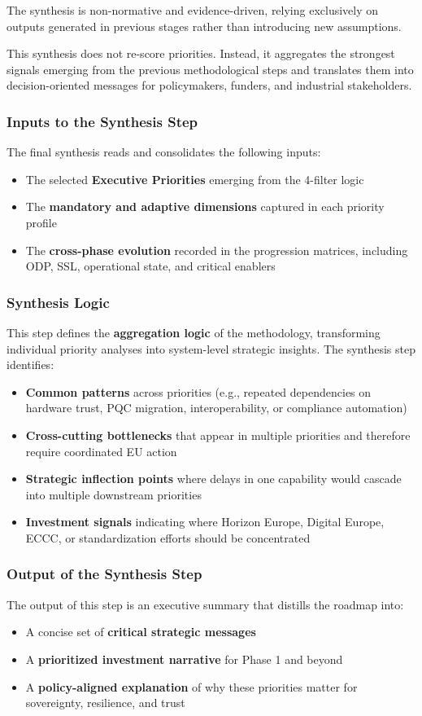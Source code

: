 \documentclass{ieeeaccess}
\begin{document}
The synthesis is non-normative and evidence-driven, relying exclusively on outputs generated in previous stages rather than introducing new assumptions.

This synthesis does not re-score priorities. Instead, it aggregates the strongest signals emerging from the previous methodological steps and translates them into decision-oriented messages for policymakers, funders, and industrial stakeholders.

\subsubsection*{Inputs to the Synthesis Step}
The final synthesis reads and consolidates the following inputs:
\begin{itemize}
    \item The selected \textbf{Executive Priorities} emerging from the 4-filter logic
    \item The \textbf{mandatory and adaptive dimensions} captured in each priority profile
    \item The \textbf{cross-phase evolution} recorded in the progression matrices, including ODP, SSL, operational state, and critical enablers
\end{itemize}

\subsubsection*{Synthesis Logic}
This step defines the \textbf{aggregation logic} of the methodology, transforming individual priority analyses into system-level strategic insights.
The synthesis step identifies:
\begin{itemize}
    \item \textbf{Common patterns} across priorities (e.g., repeated dependencies on hardware trust, PQC migration, interoperability, or compliance automation)
    \item \textbf{Cross-cutting bottlenecks} that appear in multiple priorities and therefore require coordinated EU action
    \item \textbf{Strategic inflection points} where delays in one capability would cascade into multiple downstream priorities
    \item \textbf{Investment signals} indicating where Horizon Europe, Digital Europe, ECCC, or standardization efforts should be concentrated
\end{itemize}

\subsubsection*{Output of the Synthesis Step}
The output of this step is an executive summary that distills the roadmap into:
\begin{itemize}
    \item A concise set of \textbf{critical strategic messages}
    \item A \textbf{prioritized investment narrative} for Phase 1 and beyond
    \item A \textbf{policy-aligned explanation} of why these priorities matter for sovereignty, resilience, and trust
\end{itemize}
\end{document}
